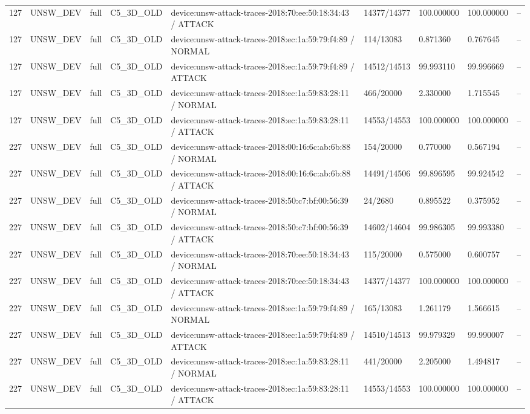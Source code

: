 \begin{tabular}{lllllllll}
127 & UNSW\_DEV & full & C5\_3D\_OLD & device:unsw-attack-traces-2018:70:ee:50:18:34:43 / ATTACK & 14377/14377 & 100.000000 & 100.000000 & -- \\
127 & UNSW\_DEV & full & C5\_3D\_OLD & device:unsw-attack-traces-2018:ec:1a:59:79:f4:89 / NORMAL & 114/13083 & 0.871360 & 0.767645 & -- \\
127 & UNSW\_DEV & full & C5\_3D\_OLD & device:unsw-attack-traces-2018:ec:1a:59:79:f4:89 / ATTACK & 14512/14513 & 99.993110 & 99.996669 & -- \\
127 & UNSW\_DEV & full & C5\_3D\_OLD & device:unsw-attack-traces-2018:ec:1a:59:83:28:11 / NORMAL & 466/20000 & 2.330000 & 1.715545 & -- \\
127 & UNSW\_DEV & full & C5\_3D\_OLD & device:unsw-attack-traces-2018:ec:1a:59:83:28:11 / ATTACK & 14553/14553 & 100.000000 & 100.000000 & -- \\
227 & UNSW\_DEV & full & C5\_3D\_OLD & device:unsw-attack-traces-2018:00:16:6c:ab:6b:88 / NORMAL & 154/20000 & 0.770000 & 0.567194 & -- \\
227 & UNSW\_DEV & full & C5\_3D\_OLD & device:unsw-attack-traces-2018:00:16:6c:ab:6b:88 / ATTACK & 14491/14506 & 99.896595 & 99.924542 & -- \\
227 & UNSW\_DEV & full & C5\_3D\_OLD & device:unsw-attack-traces-2018:50:c7:bf:00:56:39 / NORMAL & 24/2680 & 0.895522 & 0.375952 & -- \\
227 & UNSW\_DEV & full & C5\_3D\_OLD & device:unsw-attack-traces-2018:50:c7:bf:00:56:39 / ATTACK & 14602/14604 & 99.986305 & 99.993380 & -- \\
227 & UNSW\_DEV & full & C5\_3D\_OLD & device:unsw-attack-traces-2018:70:ee:50:18:34:43 / NORMAL & 115/20000 & 0.575000 & 0.600757 & -- \\
227 & UNSW\_DEV & full & C5\_3D\_OLD & device:unsw-attack-traces-2018:70:ee:50:18:34:43 / ATTACK & 14377/14377 & 100.000000 & 100.000000 & -- \\
227 & UNSW\_DEV & full & C5\_3D\_OLD & device:unsw-attack-traces-2018:ec:1a:59:79:f4:89 / NORMAL & 165/13083 & 1.261179 & 1.566615 & -- \\
227 & UNSW\_DEV & full & C5\_3D\_OLD & device:unsw-attack-traces-2018:ec:1a:59:79:f4:89 / ATTACK & 14510/14513 & 99.979329 & 99.990007 & -- \\
227 & UNSW\_DEV & full & C5\_3D\_OLD & device:unsw-attack-traces-2018:ec:1a:59:83:28:11 / NORMAL & 441/20000 & 2.205000 & 1.494817 & -- \\
227 & UNSW\_DEV & full & C5\_3D\_OLD & device:unsw-attack-traces-2018:ec:1a:59:83:28:11 / ATTACK & 14553/14553 & 100.000000 & 100.000000 & -- \\

\end{tabular}
